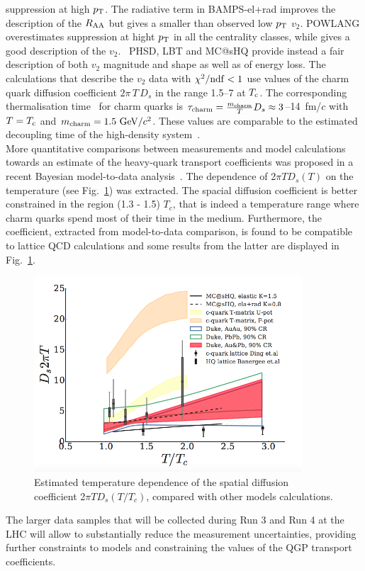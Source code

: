 suppression at high $p_{\rm T}$. The radiative term in BAMPS-el+rad improves the 
description of the $R_{\rm AA}$ but gives a smaller than observed low $p_{\rm T}$ 
$v_2$. POWLANG overestimates suppression at hight $p_{\rm T}$ in all the centrality classes,
while gives a good description of the $v_2$.
~PHSD, LBT and MC@sHQ provide instead a fair 
description of both $v_2$ magnitude and shape
as well as of energy loss. The calculations that describe the $v_2$ data 
with $\chi^2/{\rm ndf}<1$ use values of the charm quark diffusion coefficient $2\pi\,T\,D_s$ in the range 1.5--7 at $T_{\rm c}$.
The corresponding thermalisation time~\cite{Moore:2004tg} for charm
quarks is $\tau_{\rm charm}=\frac{m_{\rm charm}}{T}  D_s \approx 3$--14~fm/$c$ with $T=T_{\rm c}$ and $m_{\rm charm}=1.5~\mathrm{GeV}/c^2$. 
These values are comparable to the estimated decoupling time of the high-density system~\cite{Aamodt:2011mr}.\\





More quantitative comparisons between measurements and model
calculations towards an estimate of the heavy-quark transport coefficients
was proposed in a recent Bayesian model-to-data analysis~\cite{Xu:2017hgt}. 
The dependence of 2$\pi T D_s(T)$ on the temperature 
(see Fig.~\ref{fig:DiffCoeff}) was extracted.
The spacial diffusion coefficient is better constrained in the region (1.3 - 1.5) $T_c$, that is indeed a 
temperature range where charm quarks spend most of their time in the medium.
Furthermore, the coefficient, extracted from model-to-data comparison, 
is found to be compatible to lattice QCD calculations and some results 
from the latter are displayed in Fig.~\ref{fig:DiffCoeff}.\\

\begin{figure}[!ht]
  \centering
    \includegraphics[width=10cm]{FigCap2/DiffCoeff.png}
  \caption{Estimated temperature dependence of the spatial diffusion coefficient  2$\pi T D_s(T/T_c)$, compared with other models calculations.}
  \label{fig:DiffCoeff}
\end{figure}

The larger data samples that will be collected during Run 3 and Run 4 at the LHC will
 allow to substantially reduce the measurement uncertainties, providing further constraints to models and
 constraining the values of the QGP transport coefficients.
